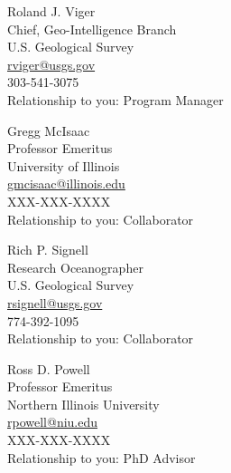 \documentclass[12pt]{article}
\begin{document}
\begin{multicols}{2}
\vspace{10pt}
Roland J. Viger\\
Chief, Geo-Intelligence Branch\\
U.S. Geological Survey\\
\url{rviger@usgs.gov} \\
303-541-3075\\
Relationship to you: Program Manager

\vspace{10pt}

Gregg McIsaac\\
Professor Emeritus\\
University of Illinois\\
\url{gmcisaac@illinois.edu}\\
XXX-XXX-XXXX\\
Relationship to you: Collaborator
   
\vspace{10pt}

Rich P. Signell\\
Research Oceanographer\\
U.S. Geological Survey\\
\url{rsignell@usgs.gov}\\
774-392-1095\\
Relationship to you: Collaborator

\vspace{10pt}

Ross D. Powell\\
Professor Emeritus\\
Northern Illinois University\\
\url{rpowell@niu.edu}\\
XXX-XXX-XXXX\\
Relationship to you: PhD Advisor



\end{multicols}
\end{document}
